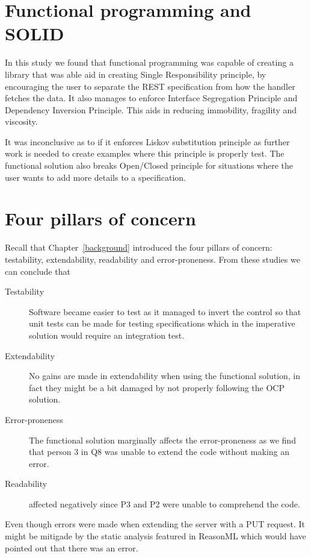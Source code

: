 \section{Functional programming and SOLID}

In this study we found that functional programming was capable of creating a
library that was able aid in creating Single Responsibility principle, by
encouraging the user to separate the REST specification from how the handler
fetches the data. It also manages to enforce Interface Segregation Principle and
Dependency Inversion Principle. This aids in reducing immobility, fragility and
viscosity.

It was inconclusive as to if it enforces Liskov substitution principle as
further work is needed to create examples where this principle is properly
test. The functional solution also breaks Open/Closed principle for situations
where the user wants to add more details to a specification.

\section{Four pillars of concern}

Recall that Chapter~\ref{background} introduced the four pillars of concern:
testability, extendability, readability and error-proneness. From these studies
we can conclude that

\begin{description}
	\item[Testability] Software became easier to test as it managed to invert
	the control so that unit tests can be made for testing specifications
	which in the imperative solution would require an integration test.
	\item[Extendability] No gains are made in extendability when using the 
	functional solution, in fact they might be a bit damaged by not properly
	following the OCP solution.
	\item[Error-proneness] The functional solution marginally affects the 
	error-proneness as we find that person 3 in Q8 was unable to extend the code without
	making an error.
	\item[Readability] affected negatively since P3 and P2 were
unable to comprehend the code.
\end{description}

Even though errors were made when extending the server with a PUT request. It
might be mitigade by the static analysis featured in ReasonML which would have
pointed out that there was an error.

